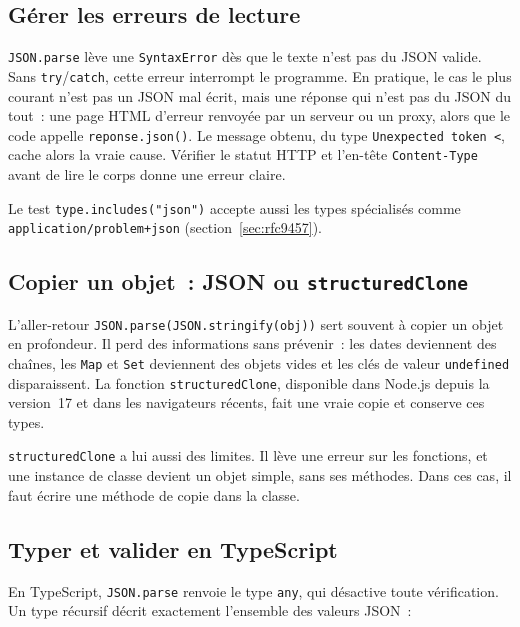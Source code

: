 \documentclass[12pt,a4paper]{article}
\newcommand{\exemple}[3][]{%
  \par\addvspace{6pt}\noindent\begin{minipage}{\linewidth}%
  \end{minipage}\par\addvspace{6pt}}
\begin{document}
\subsection{Gérer les erreurs de lecture}
\label{sec:erreurs-js}
\texttt{JSON.parse} lève une \texttt{SyntaxError} dès que le texte n'est pas du JSON valide. Sans \texttt{try}/\texttt{catch}, cette erreur interrompt le programme. En pratique, le cas le plus courant n'est pas un JSON mal écrit, mais une réponse qui n'est pas du JSON du tout~: une page HTML d'erreur renvoyée par un serveur ou un proxy, alors que le code appelle \texttt{reponse.json()}. Le message obtenu, du type \texttt{Unexpected token \textquotesingle{}<\textquotesingle{}}, cache alors la vraie cause. Vérifier le statut HTTP et l'en-tête \texttt{Content-Type} avant de lire le corps donne une erreur claire.

\exemple[language=javascript]{js/05_erreurs_parse.mjs}{Attraper les erreurs de syntaxe et les réponses qui ne sont pas du JSON}

Le test \texttt{type.includes("json")} accepte aussi les types spécialisés comme \texttt{application/problem+json} (section~\ref{sec:rfc9457}).

\subsection{Copier un objet~: JSON ou \texttt{structuredClone}}
L'aller-retour \texttt{JSON.parse(JSON.stringify(obj))} sert souvent à copier un objet en profondeur. Il perd des informations sans prévenir~: les dates deviennent des chaînes, les \texttt{Map} et \texttt{Set} deviennent des objets vides et les clés de valeur \texttt{undefined} disparaissent. La fonction \texttt{structuredClone}, disponible dans Node.js depuis la version~17 et dans les navigateurs récents, fait une vraie copie et conserve ces types.

\exemple[language=javascript]{js/06_structuredclone.mjs}{Copie par JSON et copie par \texttt{structuredClone}}

\texttt{structuredClone} a lui aussi des limites. Il lève une erreur sur les fonctions, et une instance de classe devient un objet simple, sans ses méthodes. Dans ces cas, il faut écrire une méthode de copie dans la classe.

\subsection{Typer et valider en TypeScript}
\label{sec:ts}
En TypeScript, \texttt{JSON.parse} renvoie le type \texttt{any}, qui désactive toute vérification. Un type récursif décrit exactement l'ensemble des valeurs JSON~:
\end{document}
